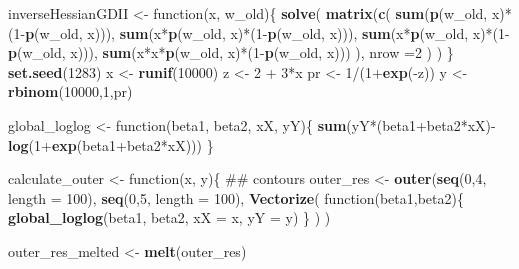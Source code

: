 \documentclass[]{article}
\newenvironment{Shaded}{\begin{snugshade}}{\end{snugshade}}
\newcommand{\KeywordTok}[1]{\textcolor[rgb]{0.13,0.29,0.53}{\textbf{{#1}}}}
\newcommand{\DataTypeTok}[1]{\textcolor[rgb]{0.13,0.29,0.53}{{#1}}}
\newcommand{\DecValTok}[1]{\textcolor[rgb]{0.00,0.00,0.81}{{#1}}}
\newcommand{\StringTok}[1]{\textcolor[rgb]{0.31,0.60,0.02}{{#1}}}
\newcommand{\NormalTok}[1]{{#1}}
\begin{document}
\begin{Shaded}
\begin{Highlighting}[]
{{\NormalTok{inverseHessianGDII <-}\StringTok{ }\NormalTok{function(x, w_old)\{}
  \KeywordTok{solve}\NormalTok{(}
    \KeywordTok{matrix}\NormalTok{(}\KeywordTok{c}\NormalTok{(}
      \KeywordTok{sum}\NormalTok{(}\KeywordTok{p}\NormalTok{(w_old, x)*(}\DecValTok{1}\NormalTok{-}\KeywordTok{p}\NormalTok{(w_old, x))),}
      \KeywordTok{sum}\NormalTok{(x*}\KeywordTok{p}\NormalTok{(w_old, x)*(}\DecValTok{1}\NormalTok{-}\KeywordTok{p}\NormalTok{(w_old, x))),}
      \KeywordTok{sum}\NormalTok{(x*}\KeywordTok{p}\NormalTok{(w_old, x)*(}\DecValTok{1}\NormalTok{-}\KeywordTok{p}\NormalTok{(w_old, x))),}
      \KeywordTok{sum}\NormalTok{(x*x*}\KeywordTok{p}\NormalTok{(w_old, x)*(}\DecValTok{1}\NormalTok{-}\KeywordTok{p}\NormalTok{(w_old, x)))}
    \NormalTok{),}
    \DataTypeTok{nrow =}\DecValTok{2} \NormalTok{)}
  \NormalTok{)}
\NormalTok{\}}
\KeywordTok{set.seed}\NormalTok{(}\DecValTok{1283}\NormalTok{)}
\NormalTok{x <-}\StringTok{ }\KeywordTok{runif}\NormalTok{(}\DecValTok{10000}\NormalTok{)}
\NormalTok{z <-}\StringTok{ }\DecValTok{2} \NormalTok{+}\StringTok{ }\DecValTok{3}\NormalTok{*x}
\NormalTok{pr <-}\StringTok{ }\DecValTok{1}\NormalTok{/(}\DecValTok{1}\NormalTok{+}\KeywordTok{exp}\NormalTok{(-z))}
\NormalTok{y <-}\StringTok{ }\KeywordTok{rbinom}\NormalTok{(}\DecValTok{10000}\NormalTok{,}\DecValTok{1}\NormalTok{,pr)}


\NormalTok{global_loglog <-}\StringTok{ }\NormalTok{function(beta1, beta2, xX, yY)\{}
  \KeywordTok{sum}\NormalTok{(yY*(beta1+beta2*xX)-}\KeywordTok{log}\NormalTok{(}\DecValTok{1}\NormalTok{+}\KeywordTok{exp}\NormalTok{(beta1+beta2*xX)))}
\NormalTok{\}}



\NormalTok{calculate_outer <-}\StringTok{ }\NormalTok{function(x, y)\{}
  \NormalTok{## contours}
  \NormalTok{outer_res <-}\StringTok{ }\KeywordTok{outer}\NormalTok{(}\KeywordTok{seq}\NormalTok{(}\DecValTok{0}\NormalTok{,}\DecValTok{4}\NormalTok{, }\DataTypeTok{length =} \DecValTok{100}\NormalTok{),}
                     \KeywordTok{seq}\NormalTok{(}\DecValTok{0}\NormalTok{,}\DecValTok{5}\NormalTok{, }\DataTypeTok{length =} \DecValTok{100}\NormalTok{),}
                     \KeywordTok{Vectorize}\NormalTok{( function(beta1,beta2)\{}
                       \KeywordTok{global_loglog}\NormalTok{(beta1, beta2, }\DataTypeTok{xX =} \NormalTok{x, }\DataTypeTok{yY =} \NormalTok{y)}
                     \NormalTok{\} )}
  \NormalTok{)}

  \NormalTok{outer_res_melted <-}\StringTok{ }\KeywordTok{melt}\NormalTok{(outer_res)}


}}
\end{Highlighting}
\end{Shaded}
\end{document}
